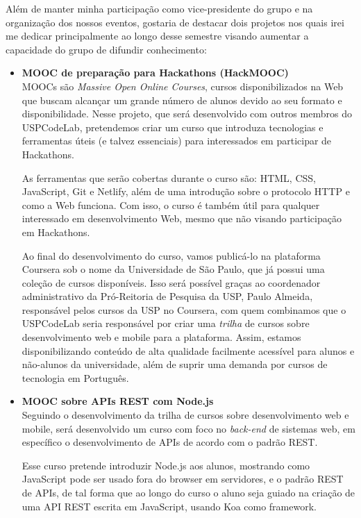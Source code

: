 \documentclass[10pt,twoside,a4paper]{article}
\begin{document}
    Além de manter minha participação como vice-presidente do grupo e na organização dos nossos eventos, gostaria de destacar dois projetos nos quais irei me dedicar principalmente ao longo desse semestre visando aumentar a capacidade do grupo de difundir conhecimento:

    \begin{itemize}
      \item \textbf{MOOC de preparação para Hackathons (HackMOOC)}\\
        MOOCs são \textit{Massive Open Online Courses}, cursos disponibilizados na Web que buscam alcançar um grande número de alunos devido ao seu formato e disponibilidade. Nesse projeto, que será desenvolvido com outros membros do USPCodeLab, pretendemos criar um curso que introduza tecnologias e ferramentas úteis (e talvez essenciais) para interessados em participar de Hackathons.
        
        As ferramentas que serão cobertas durante o curso são: HTML, CSS, JavaScript, Git e Netlify, além de uma introdução sobre o protocolo HTTP e como a Web funciona. Com isso, o curso é também útil para qualquer interessado em desenvolvimento Web, mesmo que não visando participação em Hackathons.
        
        Ao final do desenvolvimento do curso, vamos publicá-lo na plataforma Coursera sob o nome da Universidade de São Paulo, que já possui uma coleção de cursos disponíveis. Isso será possível graças ao coordenador administrativo da Pró-Reitoria de Pesquisa da USP, Paulo Almeida, responsável pelos cursos da USP no Coursera, com quem combinamos que o USPCodeLab seria responsável por criar uma \textit{trilha} de cursos sobre desenvolvimento web e mobile para a plataforma. Assim, estamos disponibilizando conteúdo de alta qualidade facilmente acessível para alunos e não-alunos da universidade, além de suprir uma demanda por cursos de tecnologia em Português.

      \item \textbf{MOOC sobre APIs REST com Node.js}\\
        Seguindo o desenvolvimento da trilha de cursos sobre desenvolvimento web e mobile, será desenvolvido um curso com foco no \textit{back-end} de sistemas web, em específico o desenvolvimento de APIs de acordo com o padrão REST.
        
        Esse curso pretende introduzir Node.js aos alunos, mostrando como JavaScript pode ser usado fora do browser em servidores, e o padrão REST de APIs, de tal forma que ao longo do curso o aluno seja guiado na criação de uma API REST escrita em JavaScript, usando Koa como framework.
    \end{itemize}
    
\end{document}
